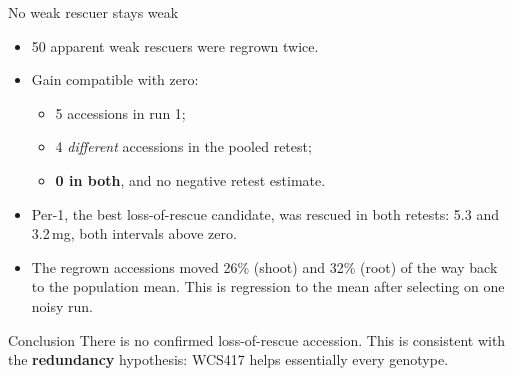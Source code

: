 \documentclass[aspectratio=169,11pt]{beamer}
\newcommand{\key}[1]{\textcolor{accent}{\textbf{#1}}}
\begin{document}
\begin{frame}{No weak rescuer stays weak}
  \begin{itemize}
    \item 50 apparent weak rescuers were regrown twice.
    \item Gain compatible with zero:
      \begin{itemize}
        \item 5 accessions in run 1;
        \item 4 \emph{different} accessions in the pooled retest;
        \item \key{0 in both}, and no negative retest estimate.
      \end{itemize}
    \item Per-1, the best loss-of-rescue candidate, was rescued in both retests:
      5.3 and 3.2\,mg, both intervals above zero.
    \item The regrown accessions moved 26\% (shoot) and 32\% (root) of the way back to the
      population mean. This is regression to the mean after selecting on one noisy run.
  \end{itemize}
  \vspace{0.6em}
  \begin{block}{Conclusion}
    There is no confirmed loss-of-rescue accession. This is consistent with the
    \key{redundancy} hypothesis: WCS417 helps essentially every genotype.
  \end{block}
\end{frame}
\end{document}
